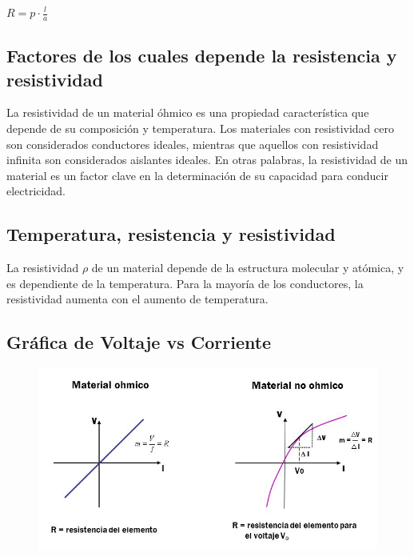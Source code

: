 \documentclass[10pt]{article}
\begin{document}
\begin{multicols}{2}
	$R = p \cdot \frac{l}{a}$

	\subsection*{Factores de los cuales depende la resistencia y resistividad}

	La resistividad de un material óhmico es una propiedad característica que
	depende de su composición y temperatura. Los materiales con resistividad
	cero son considerados conductores ideales, mientras que aquellos con
	resistividad infinita son considerados aislantes ideales. En otras
	palabras, la resistividad de un material es un factor clave en la
	determinación de su capacidad para conducir electricidad.

	\subsection*{Temperatura, resistencia y resistividad}

	La resistividad $\rho$ de un material depende de la estructura molecular y
	atómica, y es dependiente de la temperatura. Para la mayoría de los conductores,
	la resistividad aumenta con el aumento de temperatura.~\cite{KhanAcademy}

\end{multicols}

\subsection*{Gráfica de Voltaje vs Corriente}

\begin{figure}[H]
	\begin{center}
		\includegraphics[scale = 0.31]{./Images/VoltajeVsResistencia.jpg}
	\end{center}
\end{figure}
\end{document}

